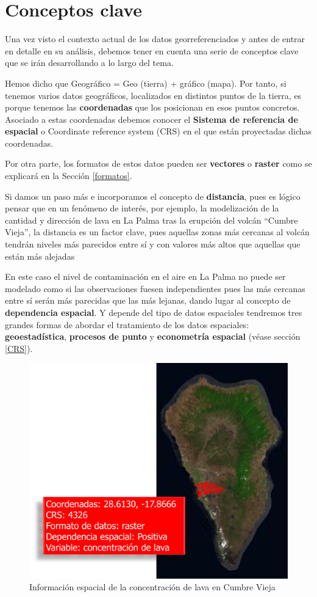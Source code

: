 \documentclass[
]{book}
\begin{document}
\hypertarget{conceptos-clave}{%
\section{Conceptos clave}\label{conceptos-clave}}

Una vez visto el contexto actual de los datos georreferenciados y antes de
entrar en detalle en su análisis, debemos tener en cuenta una serie de conceptos
clave que se irán desarrollando a lo largo del tema.

Hemos dicho que Geográfico = Geo (tierra) + gráfico (mapa). Por tanto, si
tenemos varios datos geográficos, localizados en distintos puntos de la tierra,
es porque tenemos las \textbf{coordenadas} que los posicionan en esos puntos
concretos. Asociado a estas coordenadas debemos conocer el \textbf{Sistema de
referencia de espacial} o Coordinate reference system (CRS) en el que están
proyectadas dichas coordenadas.

Por otra parte, los formatos de estos datos pueden ser \textbf{vectores} o \textbf{raster}
como se explicará en la Sección \ref{formatos}.

Si damos un paso más e incorporamos el concepto de \textbf{distancia}, pues es lógico
pensar que en un fenómeno de interés, por ejemplo, la modelización de la
cantidad y dirección de lava en La Palma tras la erupción del volcán ``Cumbre
Vieja'', la distancia es un factor clave, pues aquellas zonas más cercanas al
volcán tendrán niveles más parecidos entre sí y con valores más altos que
aquellas que están más alejadas

En este caso el nivel de contaminación en el aire en La Palma no puede ser
modelado como si las observaciones fuesen independientes pues las más cercanas
entre sí serán más parecidas que las más lejanas, dando lugar al concepto de
\textbf{dependencia espacial}. Y depende del tipo de datos espaciales tendremos tres
grandes formas de abordar el tratamiento de los datos espaciales:
\textbf{geoestadística}, \textbf{procesos de punto} y \textbf{econometría espacial} (véase
sección \ref{CRS}).

\begin{figure}

{\centering \includegraphics[width=0.6\linewidth]{img/Cumbrevieja} 

}

\caption{Información espacial de la concentración de lava en Cumbre Vieja}\label{fig:gis}
\end{figure}
\end{document}
